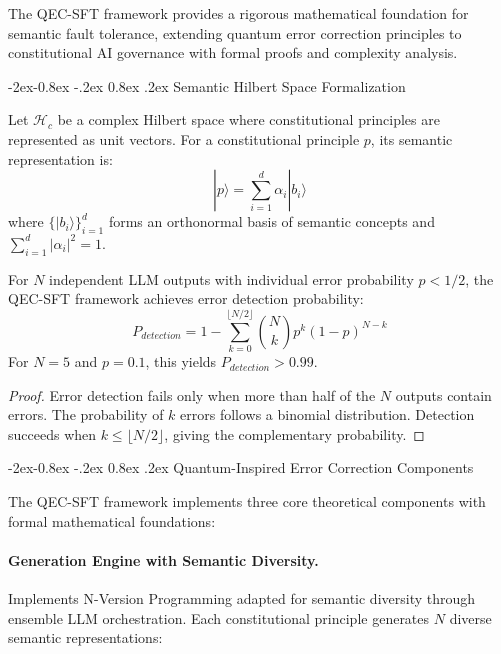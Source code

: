 \documentclass[manuscript,screen,9pt]{acmart}
\makeatletter
\renewcommand\subsubsection{\@startsection{subsubsection}{3}{\z@}%
  {-2ex\@plus -0.8ex \@minus -.2ex}%
  {0.8ex \@plus .2ex}%
  {\normalfont\normalsize\bfseries}}
\makeatother
\begin{document}
The QEC-SFT framework provides a rigorous mathematical foundation for semantic fault tolerance, extending quantum error correction principles to constitutional AI governance with formal proofs and complexity analysis.

\subsubsection{Semantic Hilbert Space Formalization}

\begin{definition}
	Let $\mathcal{H}_c$ be a complex Hilbert space where constitutional principles are represented as unit vectors. For a constitutional principle $p$, its semantic representation is:
	$$|p\rangle = \sum_{i=1}^{d} \alpha_i |b_i\rangle$$
	where $\{|b_i\rangle\}_{i=1}^d$ forms an orthonormal basis of semantic concepts and $\sum_{i=1}^d |\alpha_i|^2 = 1$.
\end{definition}

\begin{theorem}
	For $N$ independent LLM outputs with individual error probability $p < 1/2$, the QEC-SFT framework achieves error detection probability:
	$$P_{detection} = 1 - \sum_{k=0}^{\lfloor N/2 \rfloor} \binom{N}{k} p^k (1-p)^{N-k}$$
	For $N = 5$ and $p = 0.1$, this yields $P_{detection} > 0.99$.
\end{theorem}

\begin{proof}
	Error detection fails only when more than half of the $N$ outputs contain errors. The probability of $k$ errors follows a binomial distribution. Detection succeeds when $k \leq \lfloor N/2 \rfloor$, giving the complementary probability.
\end{proof}

\subsubsection{Quantum-Inspired Error Correction Components}

The QEC-SFT framework implements three core theoretical components with formal mathematical foundations:

\paragraph{Generation Engine with Semantic Diversity.} Implements N-Version Programming adapted for semantic diversity through ensemble LLM orchestration. Each constitutional principle generates $N$ diverse semantic representations:
\end{document}
